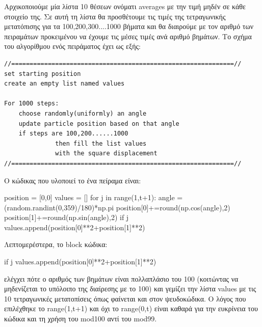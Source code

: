  Αρχικοποιούμε μία λίστα 10 θέσεων ονόματι {\en averages} με την τιμή μηδέν σε κάθε στοιχείο της. Σε αυτή τη λίστα θα προσθέτουμε τις τιμές της τετραγωνικής μετατόπισης για τα 100,200,300....1000 βήματα και θα διαιρούμε με τον αριθμό των πειραμάτων προκειμένου να έχουμε τις μέσες τιμές ανά αριθμό βημάτων.
\newpage
\noindent
Το σχήμα του αλγορίθμου ενός πειράματος έχει ως εξής: 
\en
\begin{lstlisting}
//=============================================================//
set starting position 
create an empty list named values

For 1000 steps:
    choose randomly(uniformly) an angle 
    update particle position based on that angle
    if steps are 100,200......1000 
              then fill the list values
              with the square displacement
//=============================================================//
\end{lstlisting}
\gr 
Ο κώδικας που υλοποιεί το ένα πείραμα είναι:
\en
\begin{python}
position = [0,0]
values = []
for j in range(1,t+1):
    angle = (random.randint(0,359)/180)*np.pi
    position[0]+=round(np.cos(angle),2)
    position[1]+=round(np.sin(angle),2)
    if j%
        values.append(position[0]**2+position[1]**2)
\end{python}
\gr 
Λεπτομερέστερα, το {\en block} κώδικα:
\en
\begin{python}
if j%
    values.append(position[0]**2+position[1]**2)
\end{python}
\gr ελέγχει πότε ο αριθμός των βημάτων είναι πολλαπλάσιο του 100 (κοιτώντας να μηδενίζεται το υπόλοιπο της διαίρεσης με το 100) και γεμίζει την λίστα {\en values} με τις 10 τετραγωνικές μετατοπίσεις όπως φαίνεται και στον ψευδοκώδικα. Ο λόγος που επιλέχθηκε το {\en range(1,t+1)} και όχι το {\en range(0,t)} είναι καθαρά για την ευκρίνεια του κώδικα και τη χρήση του {\en mod100} αντί του {\en mod99}.

